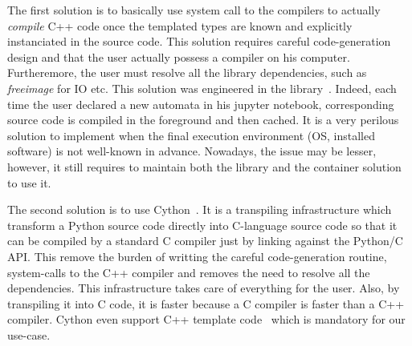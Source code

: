 The first solution is to basically use system call to the compilers to actually \emph{compile} C++ code once the
templated types are known and explicitly instanciated in the source code. This solution requires careful code-generation
design and that the user actually possess a compiler on his computer. Furtheremore, the user must resolve all the
library dependencies, such as \emph{freeimage} for IO etc. This solution was engineered in the
library~\parencite{demaille.2013.vcsn}. Indeed, each time the user declared a new automata in his jupyter notebook,
corresponding source code is compiled in the foreground and then cached. It is a very perilous solution to implement
when the final execution environment (OS, installed software) is not well-known in advance. Nowadays, the issue may be
lesser, however, it still requires to maintain both the library and the container solution to use it.

The second solution is to use Cython~\parencite{behnel.2010.cython}. It is a transpiling infrastructure which transform
a Python source code directly into C-language source code so that it can be compiled by a standard C compiler just by
linking against the Python/C API. This remove the burden of writting the careful code-generation routine, system-calls
to the C++ compiler and removes the need to resolve all the dependencies. This infrastructure takes care of everything
for the user. Also, by transpiling it into C code, it is faster because a C compiler is faster than a C++ compiler.
Cython even support C++ template code~\parencite{behnel.2022.cython-template} which is mandatory for our use-case.


